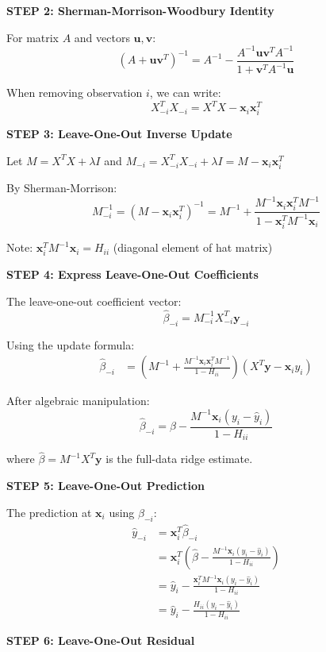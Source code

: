 \documentclass[12pt]{article}
\begin{document}
\begin{solution}
\textbf{STEP 2: Sherman-Morrison-Woodbury Identity}

For matrix $A$ and vectors $\mathbf{u}, \mathbf{v}$:
\[(A + \mathbf{u}\mathbf{v}^T)^{-1} = A^{-1} - \frac{A^{-1}\mathbf{u}\mathbf{v}^TA^{-1}}{1 + \mathbf{v}^TA^{-1}\mathbf{u}}\]

When removing observation $i$, we can write:
\[X_{-i}^TX_{-i} = X^TX - \mathbf{x}_i\mathbf{x}_i^T\]

\textbf{STEP 3: Leave-One-Out Inverse Update}

Let $M = X^TX + \lambda I$ and $M_{-i} = X_{-i}^TX_{-i} + \lambda I = M - \mathbf{x}_i\mathbf{x}_i^T$

By Sherman-Morrison:
\[M_{-i}^{-1} = (M - \mathbf{x}_i\mathbf{x}_i^T)^{-1} = M^{-1} + \frac{M^{-1}\mathbf{x}_i\mathbf{x}_i^TM^{-1}}{1 - \mathbf{x}_i^TM^{-1}\mathbf{x}_i}\]

Note: $\mathbf{x}_i^TM^{-1}\mathbf{x}_i = H_{ii}$ (diagonal element of hat matrix)

\textbf{STEP 4: Express Leave-One-Out Coefficients}

The leave-one-out coefficient vector:
\[\hat{\beta}_{-i} = M_{-i}^{-1}X_{-i}^T\mathbf{y}_{-i}\]

Using the update formula:
\begin{align*}
\hat{\beta}_{-i} &= \left(M^{-1} + \frac{M^{-1}\mathbf{x}_i\mathbf{x}_i^TM^{-1}}{1 - H_{ii}}\right)(X^T\mathbf{y} - \mathbf{x}_iy_i)
\end{align*}

After algebraic manipulation:
\[\hat{\beta}_{-i} = \hat{\beta} - \frac{M^{-1}\mathbf{x}_i(y_i - \hat{y}_i)}{1 - H_{ii}}\]

where $\hat{\beta} = M^{-1}X^T\mathbf{y}$ is the full-data ridge estimate.

\textbf{STEP 5: Leave-One-Out Prediction}

The prediction at $\mathbf{x}_i$ using $\hat{\beta}_{-i}$:
\begin{align*}
\hat{y}_{-i} &= \mathbf{x}_i^T\hat{\beta}_{-i} \\
&= \mathbf{x}_i^T\left(\hat{\beta} - \frac{M^{-1}\mathbf{x}_i(y_i - \hat{y}_i)}{1 - H_{ii}}\right) \\
&= \hat{y}_i - \frac{\mathbf{x}_i^TM^{-1}\mathbf{x}_i(y_i - \hat{y}_i)}{1 - H_{ii}} \\
&= \hat{y}_i - \frac{H_{ii}(y_i - \hat{y}_i)}{1 - H_{ii}}
\end{align*}

\textbf{STEP 6: Leave-One-Out Residual}


\end{solution}
\end{document}
